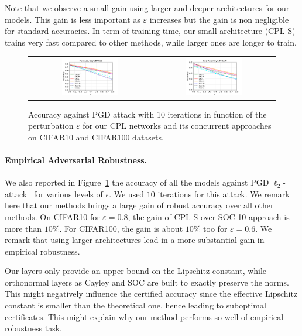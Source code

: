 Note that we observe a small gain using larger and deeper architectures for our models. This gain is less important as $\varepsilon$ increases but the gain is non negligible for standard accuracies. In term of training time, our small architecture (CPL-S) trains very fast compared to other methods, while larger ones are longer to train.


\begin{figure}[h]
    \centering
    \begin{tabular}{cc}
    \includegraphics[width =0.48\textwidth]{sections/4_certification/images/pgd_acc_eps_c10.pdf} & \includegraphics[width =0.48\textwidth]{sections/4_certification/images/pgd_acc_eps_c100.pdf}
    \end{tabular}
    \caption{Accuracy against PGD attack with 10 iterations in function of the perturbation $\varepsilon$ for our CPL networks and its concurrent approaches on CIFAR10 and CIFAR100 datasets.}
    \label{fig:pgd-acc}
\end{figure}
\paragraph{Empirical Adversarial Robustness.} We also reported in Figure~\ref{fig:pgd-acc} the accuracy of all the models against PGD $\ell_2$-attack~\citep{kurakin2016adversarial,madry2017towards} for various levels of $\epsilon$. We used $10$ iterations for this attack. We remark here that our methods brings a large gain of robust accuracy over all other methods. On CIFAR10 for $\varepsilon = 0.8$, the gain of CPL-S over SOC-10 approach is more than $10\%$. For CIFAR100, the gain is about $10\%$ too for $\varepsilon=0.6$. We remark that using larger architectures lead in a more substantial gain in empirical robustness. 

Our layers  only provide an upper bound on the Lipschitz constant, while orthonormal layers as Cayley and SOC are built to exactly preserve the norms. This might negatively influence the certified accuracy since the effective Lipschitz constant is smaller than the theoretical one, hence leading to suboptimal certificates. This might explain why our method performs so well of empirical robustness task.

